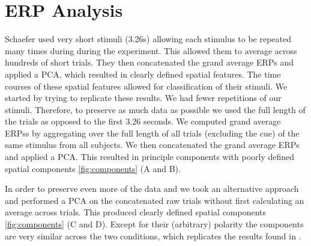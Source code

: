 \section*{ERP Analysis}
Schaefer \etal \cite{schaefer_name_2011} used very short stimuli (3.26s) allowing each stimulus to be repeated many times during during the experiment. 
This allowed them to average across hundreds of short trials. 
They then concatenated the grand average ERPs and applied a \ac{PCA}, which resulted in clearly defined spatial features. The time courses of these spatial features allowed for classification of their stimuli. We started by trying to replicate these results. 
We had fewer repetitions of our stimuli. Therefore, to preserve as much data as possible we used the full length of the trials as opposed to the first 3.26 seconds. We computed grand average \acp{ERP}s by aggregating over the full length of all trials (excluding the cue) of the same stimulus from all subjects. We then concatenated the grand average \acp{ERP} and applied a \ac{PCA}. This resulted in principle components with poorly defined spatial components \autoref{fig:components} (A and B).

In order to preserve even more of the data and we took an alternative approach and performed a \ac{PCA} on the concatenated raw trials without first calculating an average across trials. This produced clearly defined spatial components \autoref{fig:components} (C and D). Except for their (arbitrary) polarity the components are very similar across the two conditions, which replicates the results found in \cite{schaefer_name_2011}.

